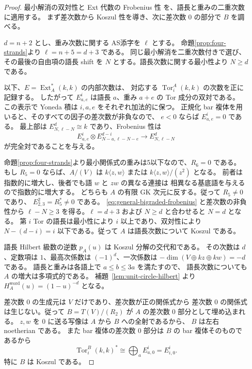 \documentclass[11pt,a4paper]{ltjsarticle}
\theoremstyle{definition}
\begin{document}
\begin{proof}
最小解消の双対性と Ext 代数の Frobenius 性
\cite[Lemma~1.1, Theorem~1.9]{LPWZ} を、語長と重みの二重次数に適用する。
まず差次数から Koszul 性を導き、次に差次数 $0$ の部分で $B$ を調べる。

$d=n+2$ とし、重み次数に関する AS添字を $\ell$ とする。
命題\ref{prop:four-strands}より $\ell=n+5=d+3$ である。
同じ最小解消を二重次数付きで選び、その最後の自由項の語長 shift を
$N$ とする。語長次数に関する最小性より $N\geq d$ である。

以下、$E=\operatorname{Ext}_A^*(k,k)$ の内部次数は、
対応する $\operatorname{Tor}^A_i(k,k)$ の次数を正に記録する。
したがって $E^i_{a,e}$ は語長 $a$、重み $a+e$ の Tor 成分の双対である。
この表示で Yoneda 積は $i,a,e$ をそれぞれ加法的に保つ。
正規化 bar 複体を用いると、そのすべての因子の差次数が非負なので、
$e<0$ ならば $E^i_{a,e}=0$ である。
最上部は $E^d_{N,\ell-N}\cong k$ であり、Frobenius 性は
\begin{equation}\label{eq:general-bigraded-frobenius}
 E^i_{a,e}\otimes
 E^{d-i}_{N-a,\ell-N-e}\longrightarrow E^d_{N,\ell-N}
\end{equation}
が完全対であることを与える。

命題\ref{prop:four-strands}より最小関係式の重みは5以下なので、$R_6=0$ である。
もし $R_5=0$ ならば、$A/(V)$ は
$k\langle z,w\rangle$ または $k\langle z,w\rangle/(z^2)$ となる。
前者は指数的に増大し、後者でも語 $w$ と $zw$ の異なる連接は
相異なる基底語を与えるので指数的に増大する。
どちらも $A$ の有限 GK 次元に反する。従って $R_5\neq0$ であり、
$E^2_{2,3}=R_5^*\neq0$ である。
\eqref{eq:general-bigraded-frobenius} と差次数の非負性から
$\ell-N\geq3$ を得る。$\ell=d+3$ および $N\geq d$ と合わせると
$N=d$ となる。
第 $i$ Tor の語長は最小性により $i$ 以上であり、双対性により
$N-(d-i)=i$ 以下である。従って $A$ は語長次数について Koszul である。

語長 Hilbert 級数の逆数 $p_A(u)$ は Koszul 分解の交代和である。
その次数は $d$、定数項は $1$、最高次係数は $(-1)^d$、一次係数は
$-\dim(V\oplus kz\oplus kw)=-d$ である。
語長と重みは各語上で $a\leq b\leq3a$ を満たすので、
語長次数についても $A$ の増大は多項式的である。
補題~\ref{lem:unit-circle-hilbert} より
$H_A^{\mathrm{word}}(u)=(1-u)^{-d}$ となる。

差次数 $0$ の生成元は $V$ だけであり、差次数が正の関係式から
差次数 $0$ の関係式は生じない。従って
$B=T(V)/(R_2)$ が $A$ の差次数 $0$ 部分として埋め込まれる。
$z,w$ を $0$ に送る写像は $A$ から $B$ への全射であるから、
$B$ は左右 noetherian である。
また bar 複体の差次数 $0$ 部分は $B$ の bar 複体そのものであるから
\begin{equation}\label{eq:general-bar-zero-excess}
 \operatorname{Tor}^B_i(k,k)^*
 \cong \bigoplus_a E^i_{a,0}=E^i_{i,0}.
\end{equation}
特に $B$ は Koszul である。


\end{proof}
\end{document}

